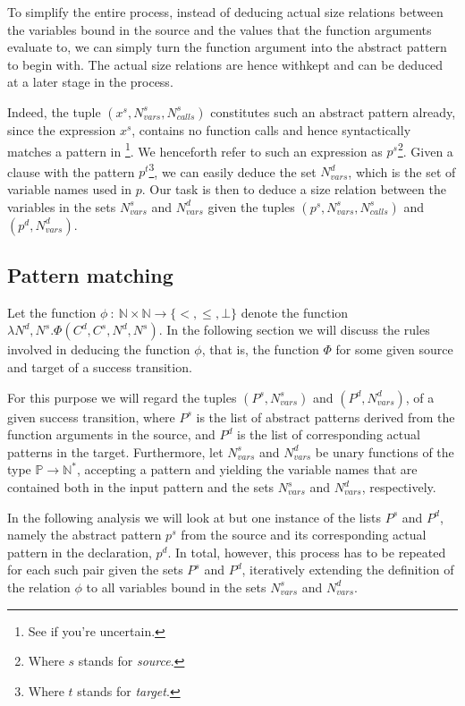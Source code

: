 To simplify the entire process, instead of deducing actual size relations
between the variables bound in the source and the values that the function
arguments evaluate to, we can simply turn the function argument into the
abstract pattern to begin with. The actual size relations are hence withkept
and can be deduced at a later stage in the process.

Indeed, the tuple $(x^s,N_{vars}^s,N_{calls}^s)$ constitutes such an abstract
pattern already, since the expression $x^s$, contains no function calls and
hence syntactically matches a pattern in \D{}\footnote{See
 if you're uncertain.}. We henceforth refer to such an
expression as $p^s$\footnote{Where $s$ stands for \emph{source}.}. Given a
clause with the pattern $p^t$\footnote{Where $t$ stands for \emph{target}.}, we
can easily deduce the set $N_{vars}^d$, which is the set of variable names used
in $p$. Our task is then to deduce a size relation between the variables in the
sets $N_{vars}^s$ and $N_{vars}^d$ given the tuples
$(p^s,N_{vars}^s,N_{calls}^s)$ and $(p^d,N_{vars}^d)$.

\subsection{Pattern matching}

Let the function $\phi\ :\ \mathbb{N} \times \mathbb{N} \rightarrow
\{<,\leq,\bot\}$ denote the function $\lambda N^d, N^s .
\Phi\left(C^d,C^s,N^d,N^s\right)$. In the following section we will discuss the
rules involved in deducing the function $\phi$, that is, the function $\Phi$
for some given source and target of a success transition.

For this purpose we will regard the tuples $(P^s,N_{vars}^s)$ and
$(P^d,N_{vars}^d)$, of a given success transition, where $P^s$ is the list of
abstract patterns derived from the function arguments in the source, and $P^d$
is the list of corresponding actual patterns in the target. Furthermore, let
$N_{vars}^s$ and $N_{vars}^d$ be unary functions of the type
$\mathbb{P}\rightarrow\mathbb{N}^*$, accepting a pattern and yielding the
variable names that are contained both in the input pattern and the sets
$N_{vars}^s$ and $N_{vars}^d$, respectively.

In the following analysis we will look at but one instance of the lists $P^s$
and $P^d$, namely the abstract pattern $p^s$ from the source and its
corresponding actual pattern in the declaration, $p^d$. In total, however, this
process has to be repeated for each such pair given the sets $P^s$ and $P^d$,
iteratively extending the definition of the relation $\phi$ to all variables
bound in the sets $N_{vars}^s$ and $N_{vars}^d$.

